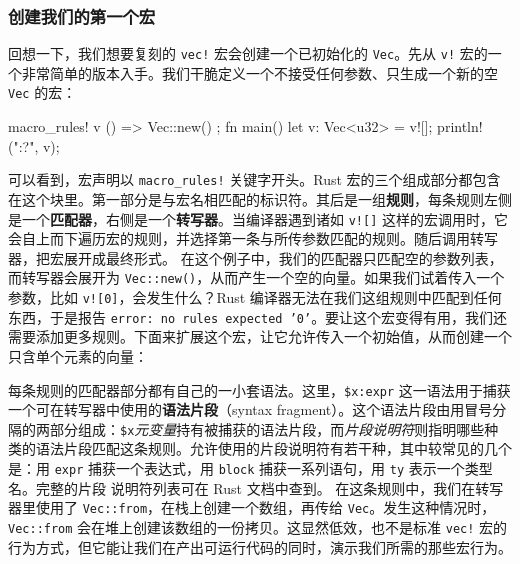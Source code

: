 \subsubsection{创建我们的第一个宏}
\label{idx:idx_912ddeae}
回想一下，我们想要复刻的 \texttt{vec!} 宏会创建一个已初始化的 \texttt{Vec}。先从 \texttt{v!} 宏的一个非常简单的版本入手。我们干脆定义一个不接受任何参数、只生成一个新的空 \texttt{Vec} 的宏：
\begin{codebox}[rust]
macro_rules! v {
  () => { Vec::new() };
}
fn main() {
  let v: Vec<u32> = v![];
  println!("{:?}", v);
}
\end{codebox}
可以看到，宏声明以 \texttt{macro\_\allowbreak{}rules!} 关键字开头。Rust 宏的三个组成部分都包含在这个块里。第一部分是与宏名相匹配的标识符。其后是一组\textbf{规则}，每条规则左侧是一个\textbf{匹配器}，右侧是一个\textbf{转写器}。当编译器遇到诸如 \texttt{v![]} 这样的宏调用时，它会自上而下遍历宏的规则，并选择第一条与所传参数匹配的规则。随后调用转写器，把宏展开成最终形式。
\label{idx:idx_fdd732ef}
在这个例子中，我们的匹配器只匹配空的参数列表，而转写器会展开为 \texttt{Vec::new()}，从而产生一个空的向量。如果我们试着传入一个参数，比如 \texttt{v![0]}，会发生什么？Rust 编译器无法在我们这组规则中匹配到任何东西，于是报告 \texttt{error: no rules expected '0'}。要让这个宏变得有用，我们还需要添加更多规则。下面来扩展这个宏，让它允许传入一个初始值，从而创建一个只含单个元素的向量：
\label{idx:idx_69aff7bd}
每条规则的匹配器部分都有自己的一小套语法。这里，\texttt{\$x:expr} 这一语法用于捕获一个可在转写器中使用的\textbf{语法片段}（syntax fragment）。这个语法片段由用冒号分隔的两部分组成：\texttt{\$x}\emph{元变量}持有被捕获的语法片段，而\emph{片段说明符}则指明哪些种类的语法片段匹配这条规则。允许使用的片段说明符有若干种，其中较常见的几个是：用 \texttt{expr} 捕获一个表达式，用
\texttt{block} 捕获一系列语句，用 \texttt{ty} 表示一个类型名。完整的片段
说明符列表可在 Rust 文档中查到。
在这条规则中，我们在转写器里使用了 \texttt{Vec::from}，在栈上创建一个数组，再传给 \texttt{Vec}。发生这种情况时，\texttt{Vec::from} 会在堆上创建该数组的一份拷贝。这显然低效，也不是标准 \texttt{vec!} 宏的行为方式，但它能让我们在产出可运行代码的同时，演示我们所需的那些宏行为。
